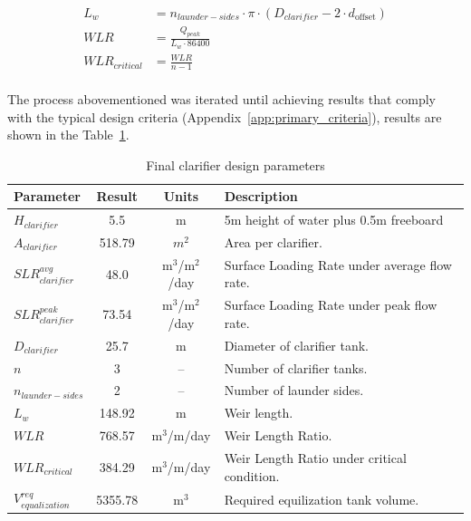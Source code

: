 \documentclass[11pt]{article}
\begin{document}
\begin{align}
L_w &= n_{launder-sides} \cdot \pi \cdot (D_{clarifier} - 2 \cdot d_{\text{offset}}) \label{eq:weir_length}\\
WLR &= \frac{Q_{peak}}{L_w \cdot 86400} \label{eq:weir_length_ratio}\\
WLR_{critical} &= \frac{WLR}{n-1} \label{eq:weir_length_ratio_critical}\\
\end{align}


The process abovementioned was iterated until achieving results that 
comply with the typical design criteria (Appendix~\ref{app:primary_criteria}), results are shown 
in the Table~\ref{tab:clarifier_results}.

\begin{table}[h]
\centering
\caption{Final clarifier design parameters}
\label{tab:clarifier_results}
\begin{tabular}{|l|c|c|l|}
\hline
\textbf{Parameter} & \textbf{Result} & \textbf{Units} & \textbf{Description} \\
\hline
$H_{clarifier}$ & 5.5 & m & 5m height of water plus 0.5m freeboard\\[0.5em]
$A_{clarifier}$ & 
518.79
& $m^2$ & Area per clarifier. \\[0.5em]
$SLR_{clarifier}^{avg}$ & 
48.0
& m$^3$/m$^2$/day & Surface Loading Rate under average flow rate.\\[0.5em]
$SLR_{clarifier}^{peak}$ & 
73.54
& m$^3$/m$^2$/day & Surface Loading Rate under peak flow rate.\\[0.5em]
$D_{clarifier}$ & 
25.7
& m & Diameter of clarifier tank.\\[0.5em]
$n$ &
3
& -- & Number of clarifier tanks.\\[0.5em]
$n_{launder-sides}$ &
2
& -- & Number of launder sides.\\[0.5em]
$L_w$ &
148.92
& m & Weir length. \\[0.5em]
$WLR$ & 
768.57
& m$^3$/m/day & Weir Length Ratio.\\[0.5em]
$WLR_{critical}$ &
384.29
& m$^3$/m/day & Weir Length Ratio under critical condition.\\[0.5em]
$V_{equalization}^{req}$ & 
5355.78
& m$^3$ & Required equilization tank volume.\\[0.5em]
\hline
\end{tabular}
\end{table}
\end{document}
